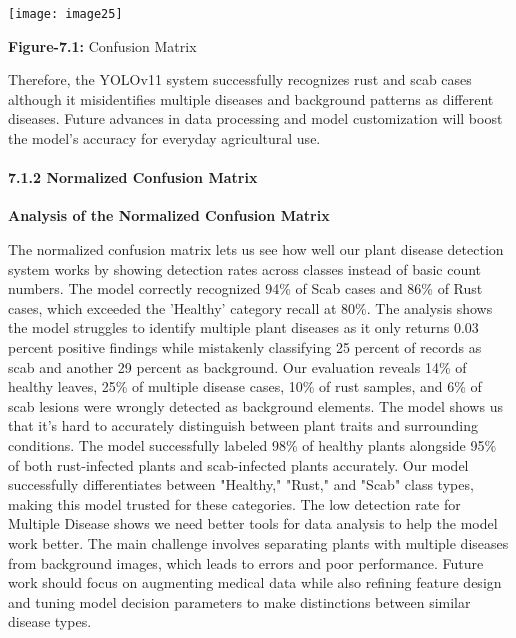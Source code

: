 \documentclass{book} %
\begin{document}
\noindent \texttt{[image: image25]}

\textbf{Figure-7.1:} Confusion Matrix

\noindent Therefore, the YOLOv11 system successfully recognizes rust and scab cases although it misidentifies multiple diseases and background patterns as different diseases. Future advances in data processing and model customization will boost the model's accuracy for everyday agricultural use.

\noindent 
\paragraph{}

\noindent 
\paragraph{7.1.2 Normalized Confusion Matrix }

\noindent \textbf{Analysis of the Normalized Confusion Matrix}

\noindent The normalized confusion matrix lets us see how well our plant disease detection system works by showing detection rates across classes instead of basic count numbers. The model correctly recognized 94\% of Scab cases and 86\% of Rust cases, which exceeded the 'Healthy' category recall at 80\%. The analysis shows the model struggles to identify multiple plant diseases as it only returns 0.03 percent positive findings while mistakenly classifying 25 percent of records as scab and another 29 percent as background. Our evaluation reveals 14\% of healthy leaves, 25\% of multiple disease cases, 10\% of rust samples, and 6\% of scab lesions were wrongly detected as background elements. The model shows us that it's hard to accurately distinguish between plant traits and surrounding conditions. The model successfully labeled 98\% of healthy plants alongside 95\% of both rust-infected plants and scab-infected plants accurately. Our model successfully differentiates between "Healthy," "Rust," and "Scab" class types, making this model trusted for these categories. The low detection rate for Multiple Disease shows we need better tools for data analysis to help the model work better. The main challenge involves separating plants with multiple diseases from background images, which leads to errors and poor performance. Future work should focus on augmenting medical data while also refining feature design and tuning model decision parameters to make distinctions between similar disease types.
\end{document}
